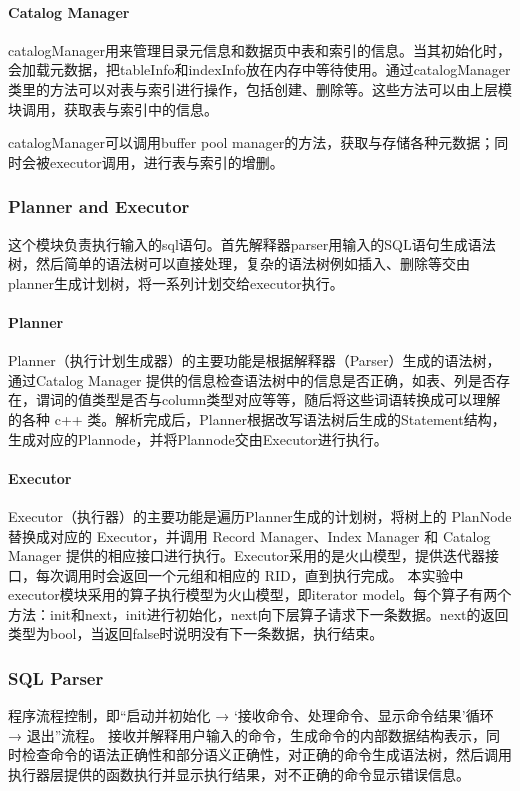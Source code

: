 \documentclass[12pt,hyperref,a4paper,UTF8]{ctexart}
\begin{document}
\paragraph{Catalog Manager}

catalogManager用来管理目录元信息和数据页中表和索引的信息。当其初始化时，会加载元数据，把tableInfo和indexInfo放在内存中等待使用。通过catalogManager类里的方法可以对表与索引进行操作，包括创建、删除等。这些方法可以由上层模块调用，获取表与索引中的信息。

catalogManager可以调用buffer pool manager的方法，获取与存储各种元数据；同时会被executor调用，进行表与索引的增删。

\subsubsection{Planner and Executor}

这个模块负责执行输入的sql语句。首先解释器parser用输入的SQL语句生成语法树，然后简单的语法树可以直接处理，复杂的语法树例如插入、删除等交由planner生成计划树，将一系列计划交给executor执行。

\paragraph{Planner}
Planner（执行计划生成器）的主要功能是根据解释器（Parser）生成的语法树，通过Catalog Manager 提供的信息检查语法树中的信息是否正确，如表、列是否存在，谓词的值类型是否与column类型对应等等，随后将这些词语转换成可以理解的各种 c++ 类。解析完成后，Planner根据改写语法树后生成的Statement结构，生成对应的Plannode，并将Plannode交由Executor进行执行。
\paragraph{Executor}
Executor（执行器）的主要功能是遍历Planner生成的计划树，将树上的 PlanNode 替换成对应的 Executor，并调用 Record Manager、Index Manager 和 Catalog Manager 提供的相应接口进行执行。Executor采用的是火山模型，提供迭代器接口，每次调用时会返回一个元组和相应的 RID，直到执行完成。
本实验中executor模块采用的算子执行模型为火山模型，即iterator model。每个算子有两个方法：init和next，init进行初始化，next向下层算子请求下一条数据。next的返回类型为bool，当返回false时说明没有下一条数据，执行结束。

\subsubsection{SQL Parser}
程序流程控制，即“启动并初始化 → ‘接收命令、处理命令、显示命令结果’循环 → 退出”流程。
接收并解释用户输入的命令，生成命令的内部数据结构表示，同时检查命令的语法正确性和部分语义正确性，对正确的命令生成语法树，然后调用执行器层提供的函数执行并显示执行结果，对不正确的命令显示错误信息。
\end{document}
